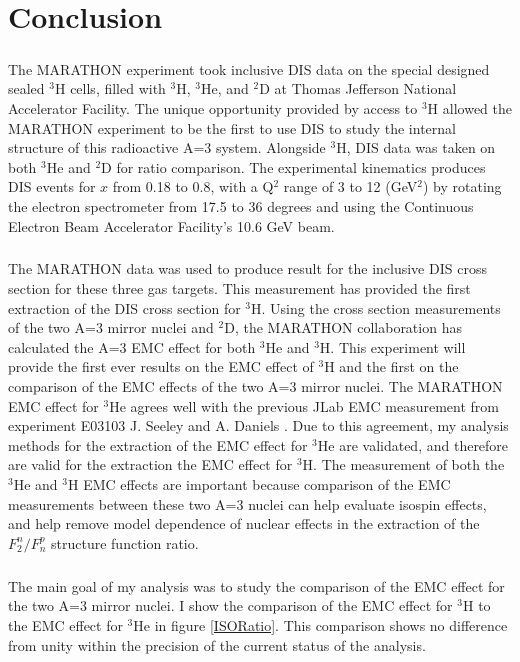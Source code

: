 
\chapter{Conclusion}
\paragraph{}The MARATHON experiment took inclusive DIS data on the special designed sealed $^3$H cells, filled with $^3$H, $^3$He, and $^2$D at Thomas Jefferson National Accelerator Facility. The unique opportunity provided by access to $^3$H allowed the MARATHON experiment to be the first to use DIS to study the internal structure of this radioactive A=3 system. Alongside $^3$H, DIS data was taken on both $^3$He and $^2$D for ratio comparison. The experimental kinematics produces DIS events for $x$ from 0.18 to 0.8, with a Q$^2$ range of 3 to 12 (GeV$^2$) by rotating the electron spectrometer from 17.5 to 36 degrees and using the Continuous Electron Beam Accelerator Facility's 10.6 GeV beam. 
\paragraph{}The MARATHON data was used to produce result for the inclusive DIS cross section for these three gas targets. This measurement has provided the first extraction of the DIS cross section for $^3$H. Using the cross section measurements of the two A=3 mirror nuclei and $^2$D, the MARATHON collaboration has calculated the A=3 EMC effect for both $^3$He and $^3$H. This experiment will provide the first ever results on the EMC effect of $^3$H and the first on the comparison of the EMC effects of the two A=3 mirror nuclei. The MARATHON EMC effect for $^3$He agrees well with the previous JLab EMC measurement from experiment E03103 J. Seeley and A. Daniels \cite{seeley}. Due to this agreement, my analysis methods for the extraction of the EMC effect for $^3$He are validated, and therefore are valid for the extraction the EMC effect for $^3$H. The measurement of both the $^3$He and $^3$H EMC effects are important because comparison of the EMC measurements between these two A=3 nuclei can help evaluate isospin effects, and help remove model dependence of nuclear effects in the extraction of the $F^n_2/F^p_n$ structure function ratio. 

\paragraph{}The main goal of my analysis was to study the comparison of the EMC effect for the two A=3 mirror nuclei. I show the comparison of the EMC effect for $^3$H to the EMC effect for $^3$He in figure \ref{ISORatio}. This comparison shows no difference from unity within the precision of the current status of the analysis. 

